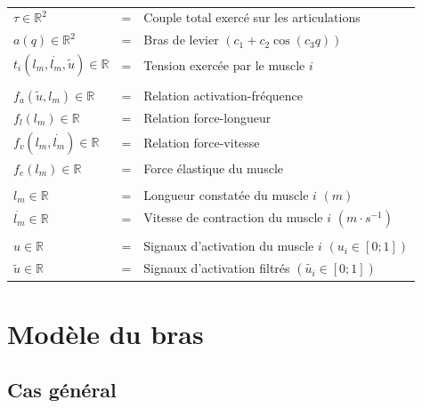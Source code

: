 \documentclass[pdftex,a4paper,11pt]{article}
\numberwithin{equation}{subsection}
\begin{document}
\paragraph{}
\begin{tabular}{lcl}
    $\tau \in \mathbb{R}^2$                & = & Couple total exercé sur les articulations \\
    $a(q) \in \mathbb{R}^2$                & = & Bras de levier $(c_1 + c_2 \cos (c_3 q))$ \\
    $t_i(l_m, \dot{l_m}, \tilde{u}) \in \mathbb{R}$    & = & Tension exercée par le muscle $i$ \\
    \\

    $f_a(\tilde{u}, l_m) \in \mathbb{R}$   & = & Relation activation-fréquence \\
    $f_l(l_m) \in \mathbb{R}$              & = & Relation force-longueur \\
    $f_v(l_m, \dot{l_m}) \in \mathbb{R}$   & = & Relation force-vitesse \\
    $f_e(l_m) \in \mathbb{R}$              & = & Force élastique du muscle \\ %
    \\

    $l_m \in \mathbb{R}$                   & = & Longueur constatée du muscle $i$ $(m)$ \\
    $\dot{l_m} \in \mathbb{R}$             & = & Vitesse de contraction du muscle $i$ $(m \cdot s^{-1})$ \\
    \\

    $u \in \mathbb{R}$                     & = & Signaux d'activation du muscle $i$ $(u_i \in [0;1])$ \\
    $\tilde{u} \in \mathbb{R}$             & = & Signaux d'activation filtrés $(\tilde{u_i} \in [0;1])$ \\
\end{tabular}



\section{Modèle du bras}


\subsection{Cas général}
\end{document}
